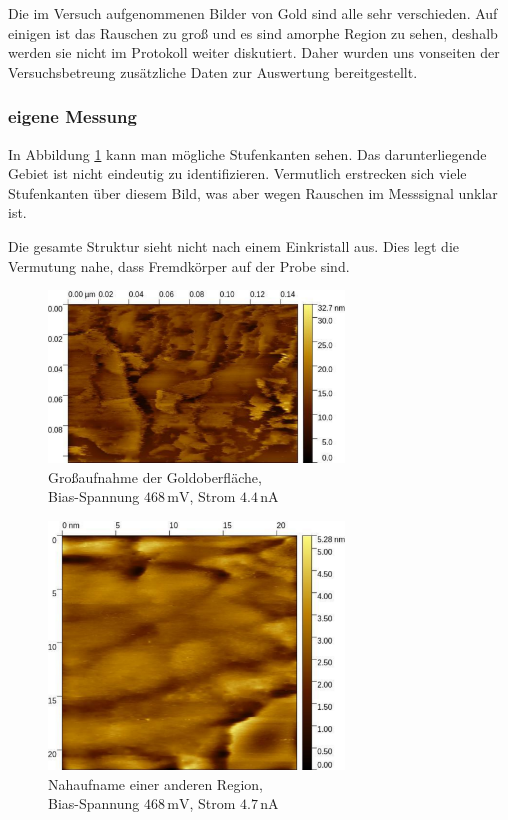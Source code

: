\documentclass[12pt,a4paper]{scrartcl}
\numberwithin{equation}{section} %
\begin{document}
Die im Versuch aufgenommenen Bilder von Gold sind alle sehr verschieden. Auf einigen ist das Rauschen zu groß und es sind amorphe Region zu sehen, deshalb werden sie nicht im Protokoll weiter diskutiert. Daher wurden uns vonseiten der Versuchsbetreung zusätzliche Daten zur Auswertung bereitgestellt. \cite{Grover}

\hypertarget{eigene-messung}{%
\subsubsection{eigene Messung}\label{eigene-messung}}
In Abbildung \ref{abb:Gold gross} kann man mögliche Stufenkanten sehen. Das darunterliegende Gebiet ist nicht eindeutig zu identifizieren. Vermutlich erstrecken sich viele Stufenkanten über diesem Bild, was aber wegen Rauschen im Messsignal unklar ist.

Die gesamte Struktur sieht nicht nach einem Einkristall aus. Dies legt die Vermutung nahe, dass Fremdkörper auf der Probe sind.

\begin{figure}[ht]
	\centering
	\includegraphics[width=0.7\textwidth]{../media/B2.5/Gold_gross.pdf}
	\caption{Großaufnahme der Goldoberfläche, \\
		Bias-Spannung $468\mathrm{\,mV}$, Strom $4.4 \mathrm{\,nA}$}
	\label{abb:Gold gross}
\end{figure}
	
\begin{figure}[ht]
	\centering
	\includegraphics[width=0.7\textwidth]{../media/B2.5/Gold_Stufenkante.pdf}
	\caption{Nahaufname einer anderen Region, \\
		Bias-Spannung $468\mathrm{\,mV}$, Strom $4.7 \mathrm{\,nA}$}
	\label{abb:Gold stufe}
\end{figure}
\end{document}
